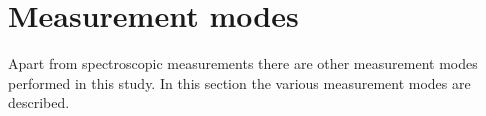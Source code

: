 \section{Measurement modes}
\label{sec:measurement-modes}

Apart from spectroscopic measurements there are other measurement modes performed in this study. In this section the various measurement modes are described.
